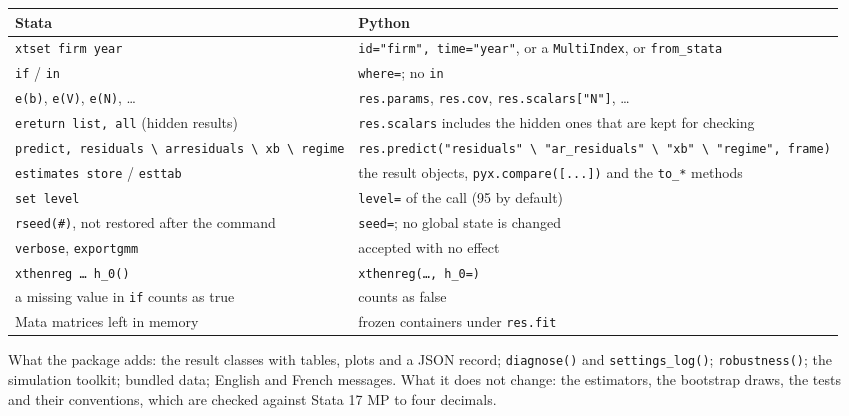 \documentclass[
  10.5pt,
  a4paper,
]{article}
\newcounter{none} %
\begin{document}
{\def\LTcaptype{none} %
\begin{longtable}[]{@{}
  >{\raggedright\arraybackslash}p{}
  >{\raggedright\arraybackslash}p{}@{}}
\toprule\noalign{}
\begin{minipage}[b]{\linewidth}\raggedright
Stata
\end{minipage} & \begin{minipage}[b]{\linewidth}\raggedright
Python
\end{minipage} \\
\midrule\noalign{}
\endhead
\bottomrule\noalign{}
\endlastfoot
\texttt{xtset\ firm\ year} & \texttt{id="firm",\ time="year"}, or a
\texttt{MultiIndex}, or \texttt{from\_stata} \\
\texttt{if} / \texttt{in} & \texttt{where=}; no \texttt{in} \\
\texttt{e(b)}, \texttt{e(V)}, \texttt{e(N)}, \ldots{} &
\texttt{res.params}, \texttt{res.cov}, \texttt{res.scalars{[}"N"{]}},
\ldots{} \\
\texttt{ereturn\ list,\ all} (hidden results) & \texttt{res.scalars}
includes the hidden ones that are kept for checking \\
\texttt{predict,\ residuals\ \textbackslash{}\textbar{}\ arresiduals\ \textbackslash{}\textbar{}\ xb\ \textbackslash{}\textbar{}\ regime}
&
\texttt{res.predict("residuals"\ \textbackslash{}\textbar{}\ "ar\_residuals"\ \textbackslash{}\textbar{}\ "xb"\ \textbackslash{}\textbar{}\ "regime",\ frame)} \\
\texttt{estimates\ store} / \texttt{esttab} & the result objects,
\texttt{pyx.compare({[}...{]})} and the \texttt{to\_*} methods \\
\texttt{set\ level} & \texttt{level=} of the call (95 by default) \\
\texttt{rseed(\#)}, not restored after the command & \texttt{seed=}; no
global state is changed \\
\texttt{verbose}, \texttt{exportgmm} & accepted with no effect \\
\texttt{xthenreg\ …\ h\_0()} & \texttt{xthenreg(…,\ h\_0=)} \\
a missing value in \texttt{if} counts as true & counts as false \\
Mata matrices left in memory & frozen containers under
\texttt{res.fit} \\
\end{longtable}
}

What the package adds: the result classes with tables, plots and a JSON
record; \texttt{diagnose()} and \texttt{settings\_log()};
\texttt{robustness()}; the simulation toolkit; bundled data; English and
French messages. What it does not change: the estimators, the bootstrap
draws, the tests and their conventions, which are checked against Stata
17 MP to four decimals.
\end{document}
